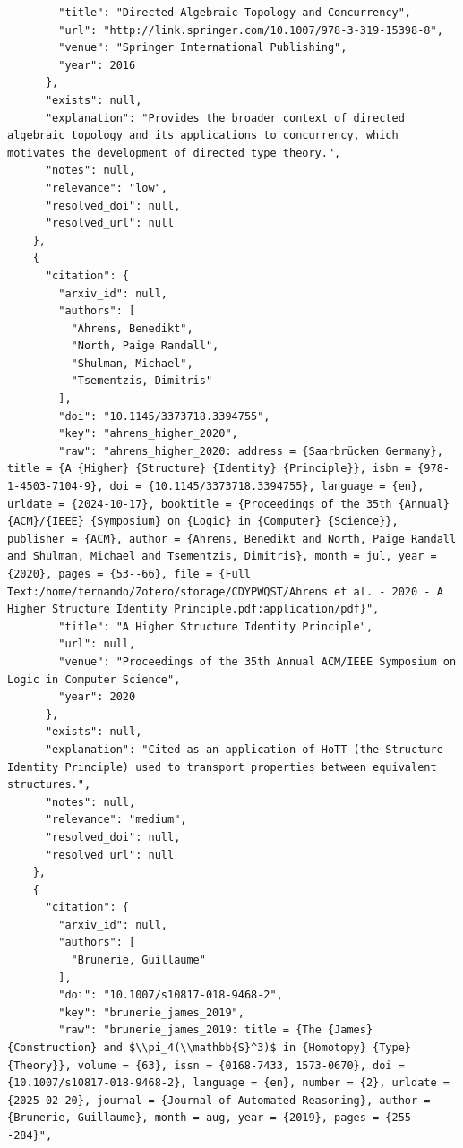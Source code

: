 \documentclass[11pt]{article}
\begin{document}
\begin{verbatim}
        "title": "Directed Algebraic Topology and Concurrency",
        "url": "http://link.springer.com/10.1007/978-3-319-15398-8",
        "venue": "Springer International Publishing",
        "year": 2016
      },
      "exists": null,
      "explanation": "Provides the broader context of directed algebraic topology and its applications to concurrency, which motivates the development of directed type theory.",
      "notes": null,
      "relevance": "low",
      "resolved_doi": null,
      "resolved_url": null
    },
    {
      "citation": {
        "arxiv_id": null,
        "authors": [
          "Ahrens, Benedikt",
          "North, Paige Randall",
          "Shulman, Michael",
          "Tsementzis, Dimitris"
        ],
        "doi": "10.1145/3373718.3394755",
        "key": "ahrens_higher_2020",
        "raw": "ahrens_higher_2020: address = {Saarbrücken Germany}, title = {A {Higher} {Structure} {Identity} {Principle}}, isbn = {978-1-4503-7104-9}, doi = {10.1145/3373718.3394755}, language = {en}, urldate = {2024-10-17}, booktitle = {Proceedings of the 35th {Annual} {ACM}/{IEEE} {Symposium} on {Logic} in {Computer} {Science}}, publisher = {ACM}, author = {Ahrens, Benedikt and North, Paige Randall and Shulman, Michael and Tsementzis, Dimitris}, month = jul, year = {2020}, pages = {53--66}, file = {Full Text:/home/fernando/Zotero/storage/CDYPWQST/Ahrens et al. - 2020 - A Higher Structure Identity Principle.pdf:application/pdf}",
        "title": "A Higher Structure Identity Principle",
        "url": null,
        "venue": "Proceedings of the 35th Annual ACM/IEEE Symposium on Logic in Computer Science",
        "year": 2020
      },
      "exists": null,
      "explanation": "Cited as an application of HoTT (the Structure Identity Principle) used to transport properties between equivalent structures.",
      "notes": null,
      "relevance": "medium",
      "resolved_doi": null,
      "resolved_url": null
    },
    {
      "citation": {
        "arxiv_id": null,
        "authors": [
          "Brunerie, Guillaume"
        ],
        "doi": "10.1007/s10817-018-9468-2",
        "key": "brunerie_james_2019",
        "raw": "brunerie_james_2019: title = {The {James} {Construction} and $\\pi_4(\\mathbb{S}^3)$ in {Homotopy} {Type} {Theory}}, volume = {63}, issn = {0168-7433, 1573-0670}, doi = {10.1007/s10817-018-9468-2}, language = {en}, number = {2}, urldate = {2025-02-20}, journal = {Journal of Automated Reasoning}, author = {Brunerie, Guillaume}, month = aug, year = {2019}, pages = {255--284}",

\end{verbatim}
\end{document}

